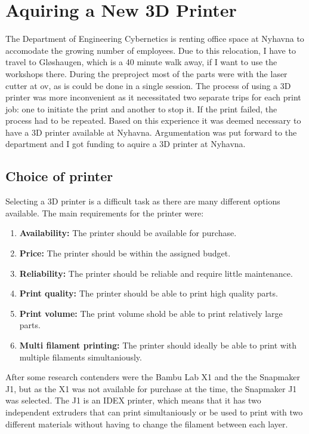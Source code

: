 \section{Aquiring a New 3D Printer}
The Department of Engineering Cybernetics is renting office space at Nyhavna to accomodate the growing number of employees.
Due to this relocation, I have to travel to Gløshaugen, which is a 40 minute walk away, if I want to use the workshops there.
During the preproject most of the parts were with the laser cutter at \gls{ov}, as is could be done in a single session.
The process of using a 3D printer was more inconvenient as it necessitated two separate trips for each print job: one to initiate the print and another to stop it.
If the print failed, the process had to be repeated.
Based on this experience it was deemed necessary to have a 3D printer available at Nyhavna.
Argumentation was put forward to the department and I got funding to aquire a 3D printer at Nyhavna.

\subsection{Choice of printer}
Selecting a 3D printer is a difficult task as there are many different options available.
The main requirements for the printer were:
\begin{enumerate}
    \item \textbf{Availability:} The printer should be available for purchase.
    \item \textbf{Price:} The printer should be within the assigned budget.
    \item \textbf{Reliability:} The printer should be reliable and require little maintenance.
    \item \textbf{Print quality:} The printer should be able to print high quality parts.
    \item \textbf{Print volume:} The print volume shold be able to print relatively large parts.
    \item \textbf{Multi filament printing:} The printer should ideally be able to print with multiple filaments simultaniously.
\end{enumerate}

After some research contenders were the Bambu Lab X1 and the the Snapmaker J1, but as the X1 was not available for purchase at the time, the Snapmaker J1 was selected.
The J1 is an IDEX printer, which means that it has two independent extruders that can print simultaniously or be used to print with two different materials without having to change the filament between each layer.

